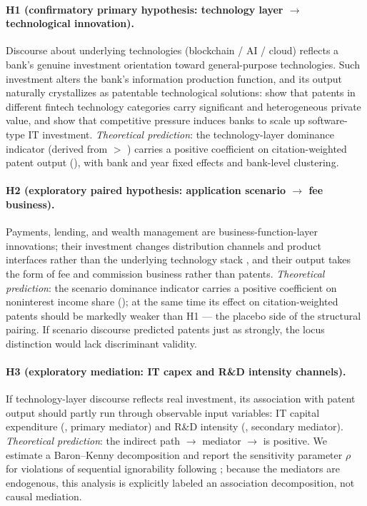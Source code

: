 \paragraph{H1 (confirmatory primary hypothesis: technology layer $\to$ technological
innovation).}
Discourse about underlying technologies (blockchain / AI / cloud) reflects a bank's
genuine investment orientation toward general-purpose technologies. Such investment
alters the bank's information production function, and its output naturally crystallizes
as patentable technological solutions: \textcite{chen2019fintechvalue} show that patents
in different fintech technology categories carry significant and heterogeneous private
value, and \textcite{he2026lendingit} show that competitive pressure induces banks to
scale up software-type IT investment. \emph{Theoretical prediction}: the
technology-layer dominance indicator  (derived from
 $>$ ) carries a positive coefficient on
citation-weighted patent output (), with bank and year
fixed effects and bank-level clustering.

\paragraph{H2 (exploratory paired hypothesis: application scenario $\to$ fee business).}
Payments, lending, and wealth management are business-function-layer innovations; their
investment changes distribution channels and product interfaces rather than the
underlying technology stack \parencite{parlour2022payments,boot2021fintech}, and their
output takes the form of fee and commission business rather than patents.
\emph{Theoretical prediction}: the scenario dominance indicator
 carries a positive coefficient on noninterest income share
(); at the same time its effect on citation-weighted
patents should be markedly weaker than H1 — the placebo side of the structural pairing.
If scenario discourse predicted patents just as strongly, the locus distinction would
lack discriminant validity.

\paragraph{H3 (exploratory mediation: IT capex and R\&D intensity channels).}
If technology-layer discourse reflects real investment, its association with patent
output should partly run through observable input variables: IT capital expenditure
(, primary mediator) and R\&D intensity (,
secondary mediator). \emph{Theoretical prediction}: the indirect path
 $\to$ mediator $\to$  is
positive. We estimate a Baron--Kenny decomposition \parencite{baron1986moderator} and
report the sensitivity parameter $\rho$ for violations of sequential ignorability
following \textcite{imai2010general}; because the mediators are endogenous, this
analysis is explicitly labeled an association decomposition, not causal mediation.


